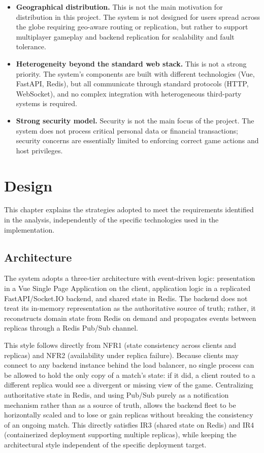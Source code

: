 \documentclass{scrartcl}
\begin{document}
\begin{itemize}
    \item \textbf{Geographical distribution.} This is not the main motivation for distribution in this project. The system is not designed for users spread across the globe requiring geo-aware routing or replication, but rather to support multiplayer gameplay and backend replication for scalability and fault tolerance.
    
    \item \textbf{Heterogeneity beyond the standard web stack.} This is not a strong priority. The system's components are built with different technologies (Vue, FastAPI, Redis), but all communicate through standard protocols (HTTP, WebSocket), and no complex integration with heterogeneous third-party systems is required.
    
    \item \textbf{Strong security model.} Security is not the main focus of the project. The system does not process critical personal data or financial transactions; security concerns are essentially limited to enforcing correct game actions and host privileges.
\end{itemize}

\section{Design}\label{design}

This chapter explains the strategies adopted to meet the requirements identified in the analysis, independently of the specific technologies used in the implementation.

\subsection{Architecture}

The system adopts a three-tier architecture with event-driven logic: presentation in a Vue Single Page Application on the client, application logic in a replicated FastAPI/Socket.IO backend, and shared state in Redis. The backend does not treat its in-memory representation as the authoritative source of truth; rather, it reconstructs domain state from Redis on demand and propagates events between replicas through a Redis Pub/Sub channel.

This style follows directly from NFR1 (state consistency across clients and replicas) and NFR2 (availability under replica failure). Because clients may connect to any backend instance behind the load balancer, no single process can be allowed to hold the only copy of a match's state: if it did, a client routed to a different replica would see a divergent or missing view of the game. Centralizing authoritative state in Redis, and using Pub/Sub purely as a notification mechanism rather than as a source of truth, allows the backend fleet to be horizontally scaled and to lose or gain replicas without breaking the consistency of an ongoing match. This directly satisfies IR3 (shared state on Redis) and IR4 (containerized deployment supporting multiple replicas), while keeping the architectural style independent of the specific deployment target.
\end{document}
